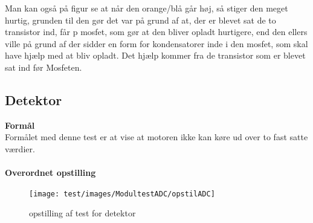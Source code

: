 Man kan også på figur se at når den orange/blå går høj, så stiger den meget hurtig, grunden til den gør det var på grund af at, der er blevet sat de to transistor ind, får p mosfet, som gør at den bliver opladt hurtigere, end den ellers ville på grund af der sidder en form for kondensatorer inde i den mosfet, som skal have hjælp med at bliv opladt. Det hjælp kommer fra de transistor som er blevet sat ind før Mosfeten.  

\subsection{Detektor}

\textbf{Formål}
\\ Formålet med denne test er at vise at motoren ikke kan køre ud over to fast satte værdier.\\
\\
\textbf{Overordnet opstilling}
\begin{figure}[H]
	\centering
	\texttt{[image: test/images/ModultestADC/opstilADC]}
	\caption{opstilling af test for detektor}
\end{figure}


